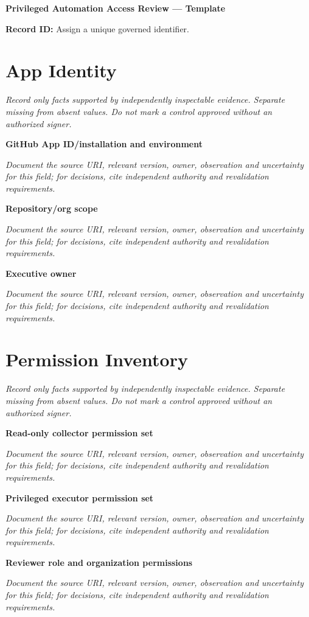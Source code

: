 \documentclass[11pt,letterpaper]{article}
\begin{document}
\begin{center}{\LARGE\bfseries Privileged Automation Access Review --- Template}\par
\vspace{4pt}{\small Guided authoring instrument (not a completed assessment)}\par
\end{center}
\noindent\textbf{Record ID:} Assign a unique governed identifier.\par
\section{App Identity}
\noindent\emph{Record only facts supported by independently inspectable evidence. Separate missing from absent values. Do not mark a control approved without an authorized signer.}\par
\noindent\textbf{GitHub App ID/installation and environment}\par
\noindent\emph{Document the source URI, relevant version, owner, observation and uncertainty for this field; for decisions, cite independent authority and revalidation requirements.}\par\medskip
\noindent\textbf{Repository/org scope}\par
\noindent\emph{Document the source URI, relevant version, owner, observation and uncertainty for this field; for decisions, cite independent authority and revalidation requirements.}\par\medskip
\noindent\textbf{Executive owner}\par
\noindent\emph{Document the source URI, relevant version, owner, observation and uncertainty for this field; for decisions, cite independent authority and revalidation requirements.}\par\medskip
\section{Permission Inventory}
\noindent\emph{Record only facts supported by independently inspectable evidence. Separate missing from absent values. Do not mark a control approved without an authorized signer.}\par
\noindent\textbf{Read-only collector permission set}\par
\noindent\emph{Document the source URI, relevant version, owner, observation and uncertainty for this field; for decisions, cite independent authority and revalidation requirements.}\par\medskip
\noindent\textbf{Privileged executor permission set}\par
\noindent\emph{Document the source URI, relevant version, owner, observation and uncertainty for this field; for decisions, cite independent authority and revalidation requirements.}\par\medskip
\noindent\textbf{Reviewer role and organization permissions}\par
\noindent\emph{Document the source URI, relevant version, owner, observation and uncertainty for this field; for decisions, cite independent authority and revalidation requirements.}\par\medskip
\end{document}
